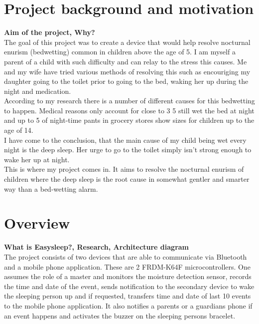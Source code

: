 \documentclass[12pt,a4paper]{article}
\begin{document}
	\section{Project background and motivation}
	{\bfseries Aim of the project, Why?}\\
	
	The goal of this project was to create a device that would help resolve nocturnal enurism (bedwetting) common in children above the age of 5. I am myself a parent of a child with  
	such difficulty and can relay to the stress this causes. Me and my wife have tried various  
	methods of resolving this such as encouriging my daughter going to the toilet prior to  
	going to the bed, waking her up during the night and medication.\\
	
	According to my research there is a number of different causes for this bedwetting to 
	happen. Medical reasons only account for close to 3%
	5 still wet the bed at night and up to 5%
	of night-time pants in grocery stores show sizes for children up to the age of 14.\\
	
	I have come to the conclusion, that the main cause of my child being wet every night is the 
	deep sleep. Her urge to go to the toilet simply isn't strong enough to wake her up at night.\\
	
	This is where my project comes in. It aims to resolve the nocturnal enurism of children 
	where the deep sleep is the root cause in somewhat gentler and smarter way than a bed-wetting
	alarm.
	\newpage
	
	\section{Overview}
	{\bfseries What is Easysleep?, Research, Architecture diagram}\\
	
	The project consists of two devices that are able to communicate via Bluetooth and a mobile phone application. These are 2 FRDM-K64F microcontrollers. One assumes the role of a master and 
	monitors the moisture detection sensor, records the time and date of the event, sends 
	notification to the secondary device to wake the sleeping person up and if requested, 
	transfers time and date of last 10 events to the mobile phone application. It also notifies a 
	parents or a guardians phone if an event happens and activates the buzzer on the sleeping 
	persons bracelet.\\
	
\end{document}
